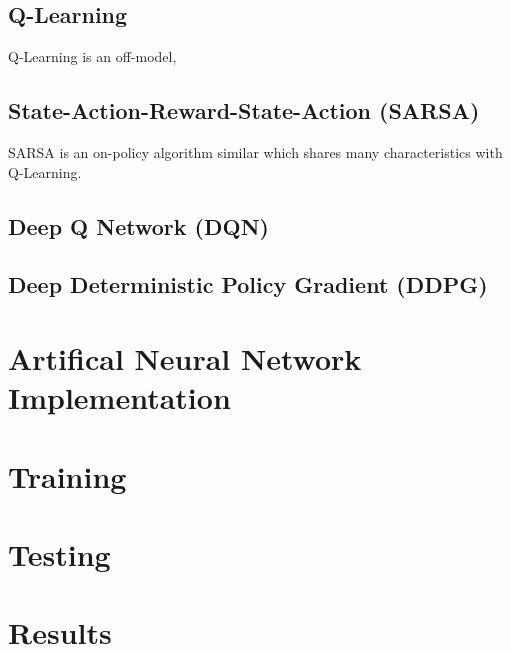 \subsection{Q-Learning}
Q-Learning is an off-model, 

\subsection{State-Action-Reward-State-Action (SARSA)}
SARSA is an on-policy algorithm similar which shares many characteristics with Q-Learning.

\subsection{Deep Q Network (DQN)}


\subsection{Deep Deterministic Policy Gradient (DDPG)}





\section{Artifical Neural Network Implementation}

\section{Training}

\section{Testing}

\section{Results}

